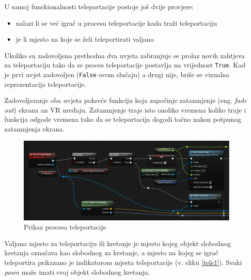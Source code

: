 \documentclass[a4paper,10pt]{article}
\begin{document}
U samoj funckionalnosti teleportacije postoje još dvije provjere:
\begin{itemize}
	\item nalazi li se već igrač u procesu teleportacije kada traži
		teleportaciju
	\item je li mjesto na koje se želi teleportirati valjano
\end{itemize}

Ukoliko su zadovoljena prethodna dva uvjeta zabranjuje
se prolaz novih zahtjeva za teleportaciju tako da se proces teleportacije
postavlja na vrijednost \texttt{True}. Kad je prvi uvjet zadovoljen
(\texttt{False} ovom slučaju) a drugi nije, briše se vizualna reprezentacija
teleportacije.

Zadovoljavanje \marginpar{\color{teal}{fade out -- padanje mraka na oči}}oba
uvjeta pokreće funkciju koja započinje zatamnjenje (eng.  \textit{fade out})
ekrana an VR uređaju. Zatamnjenje traje isto onoliko vremena koliko traje i
funkcija odgode vremena tako da se teleportacija dogodi točno nakon potpunog
zatamnjenja ekrana.

\begin{figure}[!h]
	\centering
	\includegraphics[width=1\textwidth]{slike/04.png}
	\caption{Prikaz procesa teleportacije}
\end{figure}


Valjano mjesto za teleportaciju ili kretanje je mjesto kojeg objekt slobodnog
\marginpar{\color{teal}{\small pawn -- realizacija igrača u virtualnom svijetu
(ne nužno u obliku čovjeka)}}
kretanja označava kao slobodnog za kretanje, a mjesto na kojeg se igrač
teleportira prikazano je indikatorom mjesta teleportacije (v. sliku
\ref{tele1}). Svaki \textit{pawn}  može imati svoj objekt slobodnog kretanja.
\end{document}
